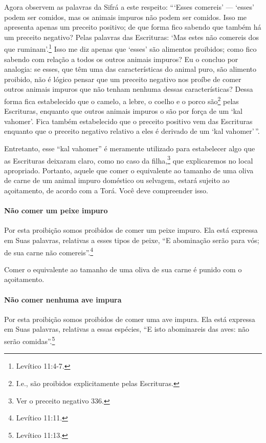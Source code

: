 Agora observem as palavras da Sifrá a este respeito: ```Esses comereis'
--- `esses' podem ser comidos, mas os animais impuros não podem ser
comidos. Isso me apresenta apenas um preceito positivo; de que forma
fico sabendo que também há um preceito negativo? Pelas palavras das
Escrituras: `Mas estes não comereis dos que ruminam'.\footnote{Levítico 11:4-7.}
Isso me diz apenas que `esses' são alimentos proibidos; como fico
sabendo com relação a todos os outros animais impuros? Eu o concluo por
analogia: se esses, que têm uma das características do animal puro, são
alimento proibido, não é lógico pensar que um preceito negativo nos
proíbe de comer outros animais impuros que não tenham nenhuma dessas
características? Dessa forma fica estabelecido que o camelo, a lebre, o
coelho e o porco são\footnote{I.e., são proibidos explicitamente pelas Escrituras.} pelas Escrituras, enquanto
que outros animais impuros o são por força de um `kal vahomer'. Fica
também estabelecido que o preceito positivo vem das Escrituras enquanto
que o preceito negativo relativo a eles é derivado de um `kal
vahomer'\,''.

Entretanto, esse ``kal vahomer'' é meramente utilizado para estabelecer
algo que as Escrituras deixaram claro, como no caso da
filha,\footnote{Ver o preceito negativo 336.} que explicaremos no local apropriado.
Portanto, aquele que comer o equivalente ao tamanho de uma oliva de
carne de um animal impuro doméstico ou selvagem, estará sujeito ao
açoitamento, de acordo com a Torá. Você deve compreender isso.


\paragraph{Não comer um peixe impuro}

Por esta proibição somos proibidos de comer um peixe impuro. Ela está
expressa em Suas palavras, relativas a esses tipos de peixe, ``E
abominação serão para vós; de sua carne não comereis''.\footnote{Levítico 11:11.}

Comer o equivalente ao tamanho de uma oliva de sua carne é punido com o
açoitamento.

\paragraph{Não comer nenhuma ave impura}

Por esta proibição somos proibidos de comer uma ave impura. Ela está
expressa em Suas palavras, relativas a essas espécies, ``E isto
abominareis das aves: não serão comidas''.\footnote{Levítico 11:13.}

